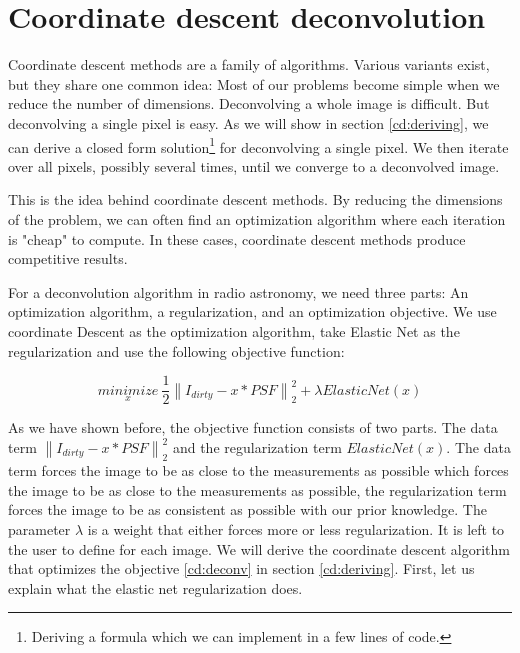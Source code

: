 \section{Coordinate descent deconvolution}\label{cd}
Coordinate descent methods are a family of algorithms. Various variants exist\cite{richtarik2016distributed, richtarik2016parallel}, but they share one common idea: Most of our problems become simple when we reduce the number of dimensions. Deconvolving a whole image is difficult. But deconvolving a single pixel is easy. As we will show in section \ref{cd:deriving}, we can derive a closed form solution\footnote{Deriving a formula which we can implement in a few lines of code.} for deconvolving a single pixel. We then iterate over all pixels, possibly several times, until we converge to a deconvolved image. 

This is the idea behind coordinate descent methods. By reducing the dimensions of the problem, we can often find an optimization algorithm where each iteration is "cheap" to compute. In these cases, coordinate descent methods produce competitive results\cite{nesterov2012efficiency, nesterov2013gradient}.

For a deconvolution algorithm in radio astronomy, we need three parts: An optimization algorithm, a regularization, and an optimization objective. We use coordinate Descent as the optimization algorithm, take Elastic Net as the regularization and use the following objective function:

\begin{equation}\label{cd:deconv}
\underset{x}{minimize} \: \frac{1}{2} \left \| I_{dirty} - x * PSF \right \|_2^2 + \lambda ElasticNet(x)
\end{equation}

As we have shown before, the objective function consists of two parts. The data term $\left \| I_{dirty} - x * PSF \right \|_2^2$ and the regularization term $ElasticNet(x)$. The data term forces the image to be as close to the measurements as possible which forces the image to be as close to the measurements as possible, the regularization term forces the image to be as consistent as possible with our prior knowledge. The parameter $\lambda$ is a weight that either forces more or less regularization. It is left to the user to define for each image. We will derive the coordinate descent algorithm that optimizes the objective \eqref{cd:deconv} in section \ref{cd:deriving}. First, let us explain what the elastic net regularization does.

